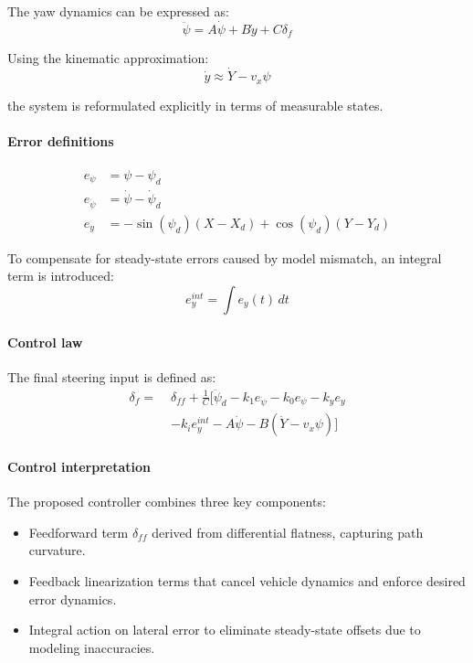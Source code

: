 \documentclass[letterpaper]{ifacconf}
\begin{document}
The yaw dynamics can be expressed as:
\begin{equation}
\ddot{\psi} = A \dot{\psi} + B \dot{y} + C \delta_f
\end{equation}

Using the kinematic approximation:
\begin{equation}
\dot{y} \approx \dot{Y} - v_x \psi
\end{equation}

the system is reformulated explicitly in terms of measurable states.

\paragraph{Error definitions}

\begin{align}
e_\psi &= \psi - \psi_d \\
e_{\dot{\psi}} &= \dot{\psi} - \dot{\psi}_d \\
e_y &= -\sin(\psi_d)(X - X_d) + \cos(\psi_d)(Y - Y_d)
\end{align}

To compensate for steady-state errors caused by model mismatch, an integral term is introduced:
\begin{equation}
e_y^{int} = \int e_y(t) \, dt
\end{equation}

\paragraph{Control law}

The final steering input is defined as:
\begin{equation}
\boxed{
\begin{aligned}
\delta_f =\;& \delta_{ff} + \frac{1}{C} \Big[ \ddot{\psi}_d 
- k_1 e_{\dot{\psi}} - k_0 e_\psi - k_y e_y \\
&- k_i e_y^{int}
- A \dot{\psi}
- B (\dot{Y} - v_x \psi)
\Big]
\end{aligned}
}
\end{equation}

\paragraph{Control interpretation}

The proposed controller combines three key components:

\begin{itemize}
\item Feedforward term $\delta_{ff}$ derived from differential flatness, capturing path curvature.
\item Feedback linearization terms that cancel vehicle dynamics and enforce desired error dynamics.
\item Integral action on lateral error to eliminate steady-state offsets due to modeling inaccuracies.
\end{itemize}
\end{document}
